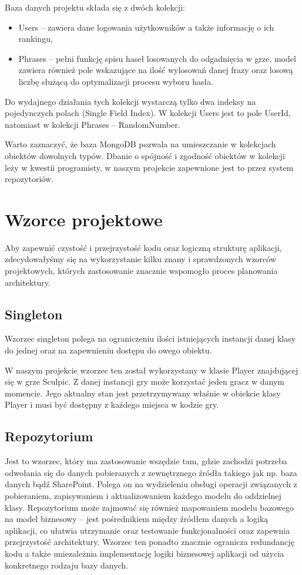 Baza danych projektu składa się z dwóch kolekcji:
\begin{itemize}
    \item Users – zawiera dane logowania użytkowników a także informację o ich rankingu,
    \item Phrases – pełni funkcję spisu haseł losowanych do odgadnięcia w grze, model zawiera również pole wskazujące na ilość wylosowań danej frazy oraz losową liczbę służącą do optymalizacji procesu wyboru hasła.
\end{itemize}

Do wydajnego działania tych kolekcji wystarczą tylko dwa indeksy na pojedynczych polach (Single Field Index). W kolekcji Users jest to pole UserId, natomiast w kolekcji Phrases – RandomNumber.

Warto zaznaczyć, że baza MongoDB pozwala na umieszczanie w kolekcjach obiektów dowolnych typów. Dbanie o spójność i zgodność obiektów w kolekcji leży w kwestii programisty, w naszym projekcie zapewnione jest to przez system repozytoriów.

\section{Wzorce projektowe}
Aby zapewnić czystość i przejrzystość kodu oraz logiczną strukturę aplikacji, zdecydowałyśmy się na wykorzystanie kilku znany i sprawdzonych wzorców projektowych, których zastosowanie znacznie wspomogło proces planowania architektury.

\subsection{Singleton}
Wzorzec singleton polega na ograniczeniu ilości istniejących instancji danej klasy do jednej oraz na zapewnieniu dostępu do owego obiektu.

W naszym projekcie wzorzec ten został wykorzystany w klasie Player znajdującej się w grze Sculpic. Z danej instancji gry może korzystać jeden gracz w danym momencie. Jego aktualny stan jest przetrzymywany właśnie w obiekcie klasy Player i musi być dostępny z każdego miejsca w kodzie gry.

\subsection{Repozytorium}
Jest to wzorzec, który ma zastosowanie wszędzie tam, gdzie zachodzi potrzeba odwołania się do danych pobieranych z zewnętrznego źródła takiego jak np. baza danych bądź SharePoint. Polega on na wydzieleniu obsługi operacji związanych z pobieraniem, zapisywaniem i aktualizowaniem każdego modelu do oddzielnej klasy. Repozytorium może zajmować się również mapowaniem modelu bazowego na model biznesowy – jest pośrednikiem między źródłem danych a logiką aplikacji, co ułatwia utrzymanie oraz testowanie funkcjonalności oraz zapewnia przejrzystość architektury. Wzorzec ten ponadto znacznie ogranicza redundancję kodu a także uniezależnia implementację logiki biznesowej aplikacji od użycia konkretnego rodzaju bazy danych.

